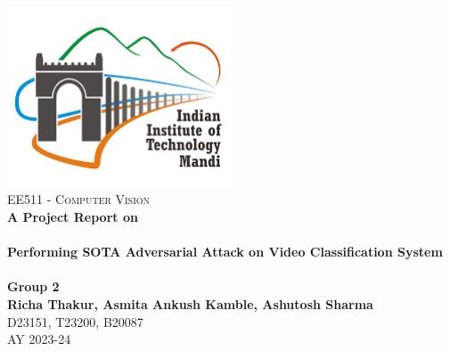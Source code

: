 \begin{titlepage}
    \vbox{ }

    \vbox{ }

    \begin{center}
        \includegraphics[width=0.5\textwidth]{img/IIT_Mandi_logo.png}\\[2cm]
        
        \textsc{\Large EE511 - Computer Vision}\\[0.7cm]
        \Large{\textbf{A Project Report on}}\\[0.5 cm]
        \noindent\makebox[\linewidth]{\rule{.7\paperwidth}{.6pt}}\\[0.7cm]
        { \huge \bfseries Performing SOTA Adversarial Attack on Video Classification System}\\[0.25cm]
        \noindent\makebox[\linewidth]{\rule{.7\paperwidth}{.6pt}}\\[0.7cm]
        
        \large
        \Large{\textbf{Group 2}}\\[1 cm]
        \textbf{Richa Thakur, Asmita Ankush Kamble, Ashutosh Sharma}\\[0.5 cm]
        D23151, T23200, B20087 \\[2cm]
        \Large{AY 2023-24}\\[1.2cm]
    \end{center}
\end{titlepage}